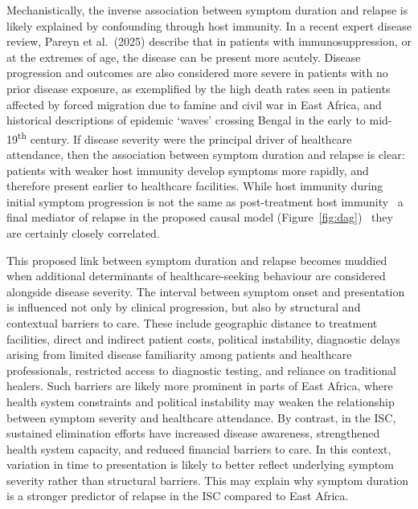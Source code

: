 Mechanistically, the inverse association between symptom duration and relapse is likely explained by confounding through host immunity. In a recent expert disease review, Pareyn et al.\ (2025) describe that in patients with immunosuppression, or at the extremes of age, the disease can be present more acutely\cite{pareyn2025}. Disease progression and outcomes are also considered more severe in patients with no prior disease exposure, as exemplified by the high death rates seen in patients affected by forced migration due to famine and civil war in East Africa\cite{collin2004,al-salem2016}, and historical descriptions of epidemic `waves' crossing Bengal in the early to mid-19\textsuperscript{th} century\cite{gibson1983, steverding2017}. If disease severity were the principal driver of healthcare attendance, then the association between symptom duration and relapse is clear: patients with weaker host immunity develop symptoms more rapidly, and therefore present earlier to healthcare facilities. While host immunity during initial symptom progression is not the same as post-treatment host immunity \textemdash\ a final mediator of relapse in the proposed causal model (Figure~\ref{fig:dag}) \textemdash\ they are certainly closely correlated.

This proposed link between symptom duration and relapse becomes muddied when additional determinants of healthcare-seeking behaviour are considered alongside disease severity. The interval between symptom onset and presentation is influenced not only by clinical progression, but also by structural and contextual barriers to care. These include geographic distance to treatment facilities, direct and indirect patient costs, political instability, diagnostic delays arising from limited disease familiarity among patients and healthcare professionals, restricted access to diagnostic testing, and reliance on traditional healers. Such barriers are likely more prominent in parts of East Africa, where health system constraints and political instability may weaken the relationship between symptom severity and healthcare attendance\cite{WHO_2024_VL_easternAfrica}. By contrast, in the ISC, sustained elimination efforts have increased disease awareness, strengthened health system capacity, and reduced financial barriers to care. In this context, variation in time to presentation is likely to better reflect underlying symptom severity rather than structural barriers. This may explain why symptom duration is a stronger predictor of relapse in the ISC compared to East Africa.

